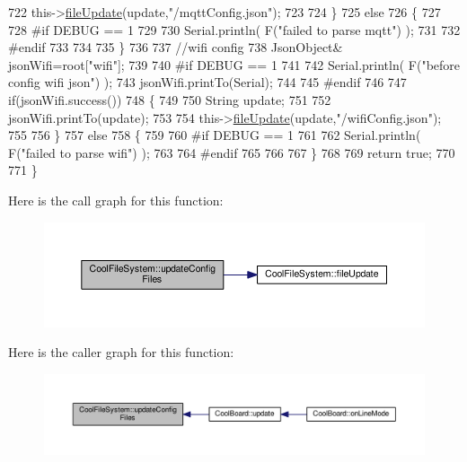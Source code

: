 \begin{DoxyCode}
722         this->\hyperlink{class_cool_file_system_a13f2958f5b87757c31fc53797a30d23a}{fileUpdate}(update,\textcolor{stringliteral}{"/mqttConfig.json"});      
723 
724     \}
725     \textcolor{keywordflow}{else}
726     \{
727 
728 \textcolor{preprocessor}{    #if DEBUG == 1 }
729 
730         Serial.println( F(\textcolor{stringliteral}{"failed to parse mqtt"}) );
731     
732 \textcolor{preprocessor}{    #endif}
733 
734     
735     \}   
736 
737     \textcolor{comment}{//wifi config}
738         JsonObject& jsonWifi=root[\textcolor{stringliteral}{"wifi"}];
739     
740 \textcolor{preprocessor}{#if DEBUG == 1 }
741 
742     Serial.println( F(\textcolor{stringliteral}{"before config wifi json"}) );
743     jsonWifi.printTo(Serial);
744 
745 \textcolor{preprocessor}{#endif}
746 
747     \textcolor{keywordflow}{if}(jsonWifi.success())
748     \{
749 
750         String update;
751     
752         jsonWifi.printTo(update);
753 
754         this->\hyperlink{class_cool_file_system_a13f2958f5b87757c31fc53797a30d23a}{fileUpdate}(update,\textcolor{stringliteral}{"/wifiConfig.json"});      
755 
756     \}
757     \textcolor{keywordflow}{else}
758     \{
759 
760 \textcolor{preprocessor}{    #if DEBUG == 1 }
761 
762         Serial.println( F(\textcolor{stringliteral}{"failed to parse wifi"}) );
763     
764 \textcolor{preprocessor}{    #endif}
765 
766     
767     \}   
768         
769     \textcolor{keywordflow}{return} \textcolor{keyword}{true};
770 
771 \}   
\end{DoxyCode}
Here is the call graph for this function\+:\nopagebreak
\begin{figure}[H]
\begin{center}
\leavevmode
\includegraphics[width=350pt]{db/d0c/class_cool_file_system_adfa8e2e80641ae6f0cceabd348a9b841_cgraph}
\end{center}
\end{figure}
Here is the caller graph for this function\+:\nopagebreak
\begin{figure}[H]
\begin{center}
\leavevmode
\includegraphics[width=350pt]{db/d0c/class_cool_file_system_adfa8e2e80641ae6f0cceabd348a9b841_icgraph}
\end{center}
\end{figure}


